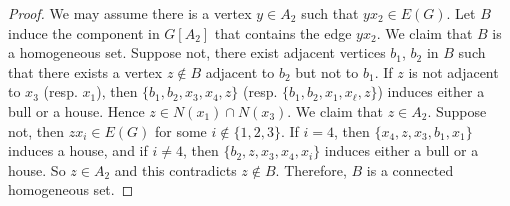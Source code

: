 \documentclass[10pt,a4paper]{amsart}
\begin{document}
\begin{proof}
    
    We may assume there is a vertex $y\in A_2$ such that $yx_2\in E(G)$. Let $B$ induce the component in $G[A_2]$ that contains the edge $yx_2$. We claim that $B$ is a homogeneous set. Suppose not, there exist adjacent vertices $b_1$, $b_2$ in $B$ such that there exists a vertex $z\notin B$ adjacent to $b_2$ but not to $b_1$. If $z$ is not adjacent to $x_3$ (resp. $x_1$), then $\{  b_1, b_2, x_3, x_4, z\}$ (resp. $\{ b_1, b_2,x_1, x_\ell,  z\}$) induces either a bull or a house. Hence $z\in N(x_1)\cap N(x_3)$.  We claim that $z\in A_2$. Suppose not, then $zx_{i}\in E(G)$ for some $i\notin \{1,2,3\}$. If $i=4$, then $\{x_4, z ,x_3, b_1, x_1\}$ induces a house, and if $i\neq 4$, then $\{ b_2, z,  x_3, x_4, x_i\}$ induces either a bull or a house. So $z\in A_2$ and this contradicts $z\notin B$. Therefore, $B$ is a connected homogeneous set.
\end{proof}
\end{document}
